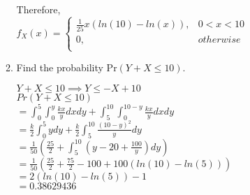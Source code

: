 \documentclass[11pt]{article}
\newcommand{\pr}{\text{Pr}}
\begin{document}
\begin{enumerate}[label=\textbf{Question \arabic*:},start=1]
\begin{enumerate}
	Therefore, \\
	$f_X(x) = \begin{cases}
		\frac{1}{25} x (ln(10) - ln(x)), & 0 < x <10 \\ 
		0, & otherwise\\
		\end{cases}$\\
	

	\item Find the probability $\pr(Y + X \leq 10)$.
	
	$Y + X \leq 10 \implies Y \leq -X + 10$\\
	
	$Pr(Y + X \leq 10) $ \\
	$ = \displaystyle{ \int_{0}^{5} \int_{0}^{y} \frac{kx}{y} dx dy + \int_{5}^{10} \int_{0}^{10-y} \frac{kx}{y} dx dy }$ \\
	$ = \displaystyle{ \frac{k}{2} \int_{0}^{5} y dy + \frac{k}{2} \int_{5}^{10} \frac{(10-y)^2}{y} dy }$ \\
	$ = \displaystyle{ \frac{1}{50} (\frac{25}{2} + \int_{5}^{10} (y - 20 + \frac{100}{y}) dy) }$ \\
	$ = \displaystyle{ \frac{1}{50} (\frac{25}{2} + \frac{75}{2} - 100 + 100(ln(10) - ln(5))) }$ \\
	$ = \displaystyle{ 2(ln(10) - ln(5)) - 1 }$ \\
	$ = 0.38629436 $
	


\end{enumerate}

\end{enumerate}
\end{document}
